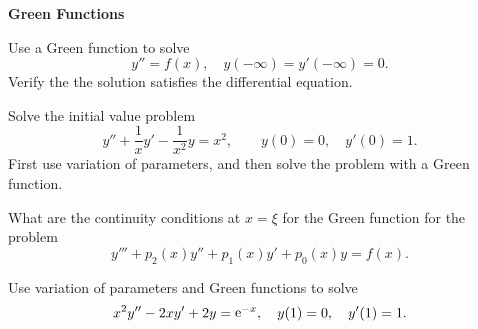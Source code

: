 {%
\begin{large}
  \noindent
  \textbf{Green Functions}
\end{large}



\begin{Exercise}
  \label{exercise y=f y=y=0}
  Use a Green function to solve
  \[
  y'' = f(x), \quad y(-\infty) = y'(-\infty) = 0.
  \]
  Verify the the solution satisfies the differential equation.

\end{Exercise}


\begin{Exercise}
  \label{exercise y+1xy-1x2y=x2}
  Solve the initial value problem
  \[ 
  y'' + \frac{1}{x} y' - \frac{1}{x^2}y = x^2, 
  \qquad y(0)=0, \quad y'(0) = 1.
  \]
  First use variation of parameters, and then solve the problem with a 
  Green function.

\end{Exercise}








\begin{Exercise}
  \label{exercise continuity y+p2y+p1y+p0y=f}
  What are the continuity conditions at $x=\xi$ for the Green function 
  for the problem
  \[ 
  y''' + p_2(x) y'' + p_1(x) y' + p_0(x) y = f(x). 
  \]

\end{Exercise}










\begin{Exercise}
  \label{exercise x2y-2xy+2y=e-x}
  Use variation of parameters and Green functions to solve
  \[
  x^2 y'' - 2 x y' + 2 y = \mathop{\mathrm{e}}\nolimits^{-x}, \quad y(1) = 0, \quad y'(1) = 1.
  \]

\end{Exercise}






}
